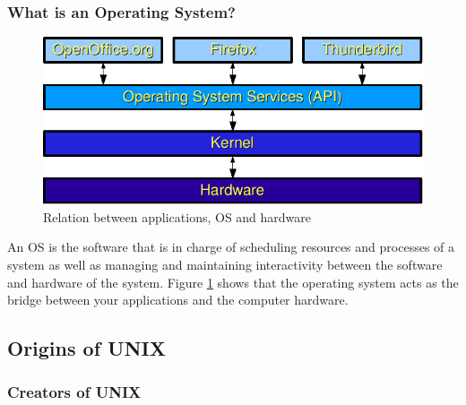 \documentclass[a4paper]{beamer}
\newcommand{\ftitle}[1]{\frametitle<presentation>{#1}}
\begin{document}
\begin{frame}
\ftitle{What is an Operating System?}
\begin{figure}
\begin{center}
\includegraphics[width=0.7\linewidth]{os-layers}
\end{center}
\caption{Relation between applications, OS and hardware}
\label{fig:os}
\end{figure}
\end{frame}

An OS is the software that is in charge of scheduling resources and processes 
of a system as well as managing and maintaining interactivity between the
software and hardware of the system. Figure \ref{fig:os} shows that the
operating system acts as the bridge between your applications and the computer
hardware.  

\subsection{Origins of UNIX}

\begin{frame}
\ftitle{Creators of UNIX}
\end{frame}
\end{document}
